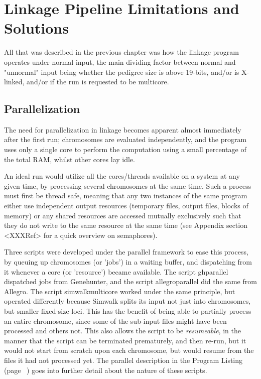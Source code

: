\section{Linkage Pipeline Limitations and Solutions}

All that was described in the previous chapter was how the linkage program operates under normal input, the main dividing factor between normal and "unnormal" input being whether the pedigree size is above 19-bits, and/or is X-linked, and/or if the run is requested to be multicore.

\subsection{Parallelization}

The need for parallelization in linkage becomes apparent almost immediately after the first run; chromosomes are evaluated independently, and the program uses only a single core to perform the computation using a small percentage of the total RAM, whilst other cores lay idle.

An ideal run would utilize all the cores/threads available on a system at any given time, by processing several chromosomes at the same time.  Such a process must first be \gls{thread safe}, meaning that any two instances of the same program either use independent output resources (temporary files, output files, blocks of memory) or any shared resources are accessed mutually exclusively such that they do not write to the same resource at the same time (see Appendix section <XXXRef> for a quick overview on semaphores).

Three scripts were developed under the parallel framework to ease this process, by queuing up chromosomes (or 'jobs') in a waiting buffer, and dispatching from it whenever a core (or 'resource') became available. The script \gls{ghparallel} dispatched jobs from Genehunter, and the script \gls{allegroparallel} did the same from Allegro. The script \gls{simwalkmulticore} worked under the same principle, but operated differently because Simwalk splits its input not just into chromosomes, but smaller fixed-size loci. This has the benefit of being able to partially process an entire chromosome, since some of the sub-input files might have been  processed and others not. This also allows the script to be \textit{resumeable}, in the manner that the script can be terminated prematurely, and then re-run, but it would not start from scratch upon each chromosome, but would resume from the files it had not processed yet. The parallel description in the Program Listing (page ~\pageref{ref:meth:proglist}) goes into further detail about the nature of these scripts.

